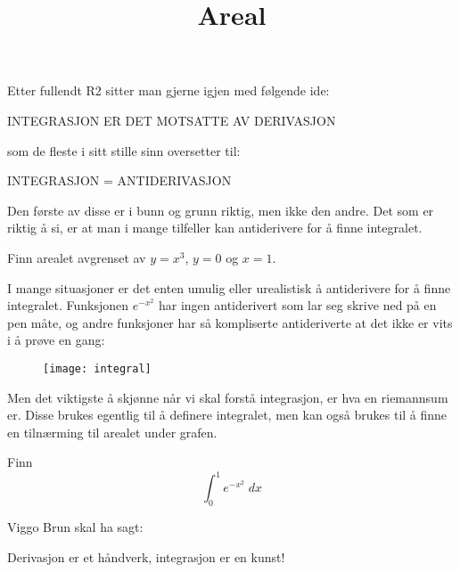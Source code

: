\documentclass[a4paper,norsk,11pt]{interaktiv}
\title{Areal}
\begin{document}

\maketitle

Etter fullendt R2 sitter man gjerne igjen med følgende ide:

\begin{tcolorbox}
INTEGRASJON ER DET MOTSATTE AV DERIVASJON
\end{tcolorbox}

som de fleste i sitt stille sinn oversetter til:

\begin{tcolorbox}
INTEGRASJON = ANTIDERIVASJON
\end{tcolorbox}

Den første av disse er i bunn og grunn riktig, 
men ikke den andre.
Det som er riktig å si,
er at man i mange tilfeller kan antiderivere for å finne integralet.


\begin{oppgave}{1}
Finn arealet avgrenset av $y=x^3$, $y=0$ og $x=1$.
\end{oppgave}


I mange situasjoner er det enten umulig eller urealistisk å antiderivere for å finne integralet. 
Funksjonen $e^{-x^2}$ har ingen antiderivert som lar seg skrive ned på en pen måte, 
og andre funksjoner har så kompliserte antideriverte at det ikke er vits i å prøve en gang:
\begin{figure}[htbp]
  \begin{center}
	\texttt{[image: integral]}
	\end{center}
\end{figure}

Men det viktigste å skjønne når vi skal forstå integrasjon, 
er hva en riemannsum er. 
Disse brukes egentlig til å definere integralet, 
men kan også brukes til å finne en tilnærming til arealet under grafen.

\begin{oppgave}{2}
Finn 
\[
\int_0^1 e^{-x^2}\; dx
\]
\end{oppgave}

Viggo Brun skal ha sagt:
\begin{tcolorbox}
Derivasjon er et håndverk, integrasjon er en kunst!
\end{tcolorbox}
\end{document}
